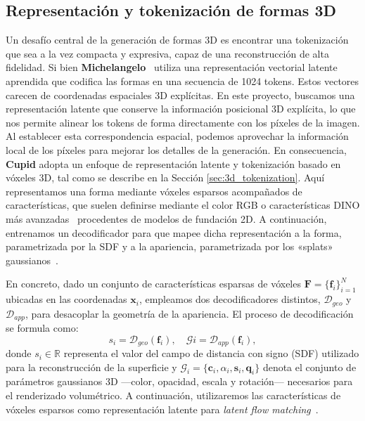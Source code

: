 \documentclass[../../book-main_es.tex]{subfiles}
\begin{document}
\subsection{Representación y tokenización de formas 3D}

Un desafío central de la generación de formas 3D es encontrar una tokenización que 
sea a la vez compacta y expresiva, capaz de una reconstrucción de alta fidelidad. Si 
bien \textbf{Michelangelo}~\citep{zhao2023michelangelo} utiliza una representación vectorial 
latente aprendida que codifica las formas en una secuencia de 1024 tokens. Estos vectores 
carecen de coordenadas espaciales 3D explícitas. En este proyecto, buscamos una representación 
latente que conserve la información posicional 3D explícita, lo que nos permite alinear los 
tokens de forma directamente con los píxeles de la imagen. Al establecer esta correspondencia 
espacial, podemos aprovechar la información local de los píxeles para mejorar los detalles de 
la generación. En consecuencia, \textbf{Cupid} adopta un enfoque de representación latente y 
tokenización basado en vóxeles 3D, tal como se describe en la Sección \ref{sec:3d_tokenization}. 
Aquí representamos una forma mediante vóxeles esparsos acompañados de características, que 
suelen definirse mediante el color RGB o características DINO más avanzadas~\citep{DINOv2} 
procedentes de modelos de fundación 2D. A continuación, entrenamos un decodificador para que mapee 
dicha representación a la forma, parametrizada por la SDF y a la apariencia, 
parametrizada por los «splats» gaussianos~\citep{kerbl20233d}.

En concreto, dado un conjunto de características esparsas de vóxeles 
$\boldsymbol{F} = \{\boldsymbol{f}_i\}_{i=1}^N$ ubicadas en las coordenadas 
$\boldsymbol{x}_i$, empleamos dos decodificadores distintos, 
$\mathcal{D}_{geo}$ y $\mathcal{D}_{app}$, para desacoplar la geometría de la 
apariencia. El proceso de decodificación se formula como:
\begin{equation}
s_i = \mathcal{D}_{geo}(\boldsymbol{f}_i), \quad \mathcal{G}i = \mathcal{D}_{app}(\boldsymbol{f}_i),
\end{equation}
donde $s_i \in \mathbb{R}$ representa el valor del campo de distancia con signo (SDF) utilizado para la reconstrucción de 
la superficie y $\mathcal{G}_i = \{\boldsymbol{c}_i, \alpha_i, \boldsymbol{s}_i, \boldsymbol{q}_i\}$ denota el conjunto 
de parámetros gaussianos 3D ---color, opacidad, escala y rotación--- necesarios para el renderizado volumétrico. 
A continuación, utilizaremos las características de vóxeles esparsos como representación latente para \textit{latent flow matching}~\citep{rombach2022high}.
\end{document}
